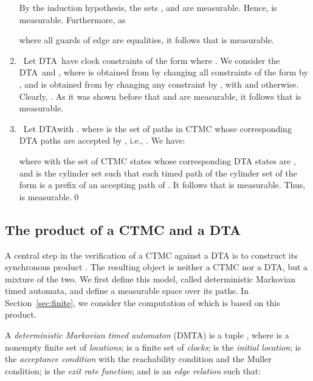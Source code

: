 \documentclass{LMCS}
\newcommand{\<}{\langle}
\renewcommand{\>}{\rangle}
\newcommand{\DTA}{\textsc{DTA}}
\newcommand{\DTAr}{\DTA}
\newcommand{\DTAo}{\DTA}
\newcommand{\DMTA}{\textsc{DMTA}}
\begin{document}
\begin{enumerate}
By the induction hypothesis, the sets
,
 and
 are measurable.
Hence,  is measurable.
Furthermore, as

where all guards  of edge  are equalities, it follows that 
is measurable.

\item{}\
Let \DTAr\  have clock constraints of the form  where .
We consider the \DTA\  and , where 
is obtained from  by changing all constraints of the form  by
, and  is obtained from  by changing any
constraint  by , with 
and  otherwise.
Clearly, .
As it was shown before that  and  are measurable, it follows that 
is measurable.
\item{}\
Let \DTAo  with .
 where  is the set of paths
in CTMC  whose corresponding DTA paths are accepted by , i.e., .
We have:

where  with  the set of CTMC states whose
corresponding DTA states are , and  is the cylinder set such that each timed path of the cylinder set of the form  is a prefix of an accepting
path of .
It follows that  is measurable.
Thus,  is measurable.\qed
\end{enumerate}



\subsection{The product of a CTMC and a DTA}\label{sec:big_product}
A central step in the verification of a CTMC  against a DTA  is
to construct its synchronous product .  The resulting
object is neither a CTMC nor a DTA, but a mixture of the two.  We first define this
model, called deterministic Markovian timed automata, and define a measurable
space over its paths.  In Section~\ref{sec:finite}, we consider
the computation of 
which is based on this product.

\begin{defi}[\DMTA]\label{def:MTA} A \emph{deterministic Markovian
timed automaton} (\DMTA) is a tuple , where  is a nonempty finite set of \emph{locations}; 
is a finite set of \emph{clocks};  is the \emph{initial location};
 is the \emph{acceptance condition} with  the reachability condition and  the Muller condition;  is the
\emph{exit rate function}; and  is an \emph{edge relation} such that:

\end{defi}
\end{document}
